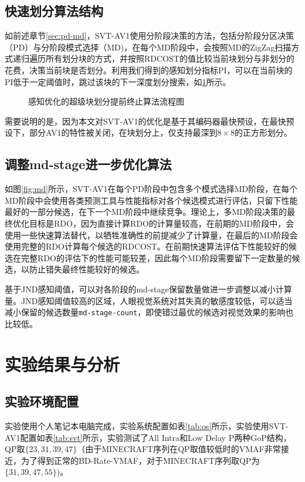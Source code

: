  \subsection{快速划分算法结构}

  如前述章节\ref{sec:pd-md}，SVT-AV1使用分阶段决策的方法，包括分阶段分区决策（PD）与分阶段模式选择（MD)，在每个MD阶段中，会按照MD的ZigZag扫描方式递归遍历所有划分块的方式，并按照RDCOST的值比较当前块划分与非划分的花费，决策当前块是否划分。利用我们得到的感知划分指标PI，可以在当前块的PI低于一定阈值时，跳过该块的下一深度划分搜索，如\ref{fig:jnd-part-PI-alg}所示。

  \begin{figure}[!htp]
    \centering
    \resizebox{0.6\textwidth}{!}{}
    \caption{感知优化的超级块划分提前终止算法流程图}
    \label{fig:jnd-part-PI-alg}
  \end{figure}

  需要说明的是，因为本文对SVT-AV1的优化是基于其编码器最快预设，在最快预设下，部分AV1的特性被关闭，在块划分上，仅支持最深到$8 \times 8$的正方形划分。

  \subsection{调整md-stage进一步优化算法}
  如图\ref{fig:md}所示，SVT-AV1在每个PD阶段中包含多个模式选择MD阶段，在每个MD阶段中会使用各类预测工具与性能指标对各个候选模式进行评估，只留下性能最好的一部分候选，在下一个MD阶段中继续竞争。理论上，多MD阶段决策的最终优化目标是RDO，因为直接计算RDO的计算量较高，在前期的MD阶段中，会使用一些快速算法替代，以牺牲准确性的前提减少了计算量，在最后的MD阶段会使用完整的RDO计算每个候选的RDCOST。在前期快速算法评估下性能较好的候选在完整RDO的评估下的性能可能较差，因此每个MD阶段需要留下一定数量的候选，以防止错失最终性能较好的候选。

  基于JND感知阈值，可以对各阶段的md-stage保留数量做进一步调整以减小计算量。JND感知阈值较高的区域，人眼视觉系统对其失真的敏感度较低，可以适当减小保留的候选数量\texttt{md-stage-count}，即使错过最优的候选对视觉效果的影响也比较低。

  \section{实验结果与分析\label{sec:jnd-test}}

  \subsection{实验环境配置}
  实验使用个人笔记本电脑完成，实验系统配置如表\ref{tab:os}所示，实验使用SVT-AV1配置如表\ref{tab:svt}所示，实验测试了All Intra和Low Delay P两种GoP结构，QP取$\{23, 31, 39, 47\}$（由于MINECRAFT序列在QP取值较低时的VMAF非常接近，为了得到正常的BD-Rate-VMAF，对于MINECRAFT序列取QP为$\{31, 39, 47, 55\}$)。

